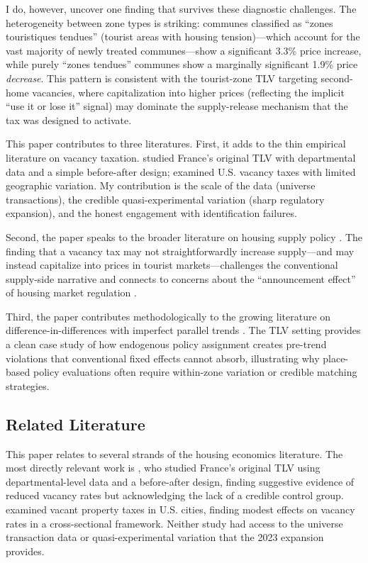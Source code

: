 \documentclass[12pt]{article}
\begin{document}
I do, however, uncover one finding that survives these diagnostic challenges. The heterogeneity between zone types is striking: communes classified as ``zones touristiques tendues'' (tourist areas with housing tension)---which account for the vast majority of newly treated communes---show a significant 3.3\% price increase, while purely ``zones tendues'' communes show a marginally significant 1.9\% price \textit{decrease}. This pattern is consistent with the tourist-zone TLV targeting second-home vacancies, where capitalization into higher prices (reflecting the implicit ``use it or lose it'' signal) may dominate the supply-release mechanism that the tax was designed to activate.

This paper contributes to three literatures. First, it adds to the thin empirical literature on vacancy taxation. \citet{bono2012evaluating} studied France's original TLV with departmental data and a simple before-after design; \citet{deboer2004vacant} examined U.S. vacancy taxes with limited geographic variation. My contribution is the scale of the data (universe transactions), the credible quasi-experimental variation (sharp regulatory expansion), and the honest engagement with identification failures.

Second, the paper speaks to the broader literature on housing supply policy \citep{saiz2010geographic, hilber2016impact, gyourko2008new}. The finding that a vacancy tax may not straightforwardly increase supply---and may instead capitalize into prices in tourist markets---challenges the conventional supply-side narrative and connects to concerns about the ``announcement effect'' of housing market regulation \citep{autor2014housing, diamond2019effects}.

Third, the paper contributes methodologically to the growing literature on difference-in-differences with imperfect parallel trends \citep{roth2023pretest, rambachan2023more, goodmanbacon2021difference}. The TLV setting provides a clean case study of how endogenous policy assignment creates pre-trend violations that conventional fixed effects cannot absorb, illustrating why place-based policy evaluations often require within-zone variation or credible matching strategies.

\subsection*{Related Literature}

This paper relates to several strands of the housing economics literature. The most directly relevant work is \citet{bono2012evaluating}, who studied France's original TLV using departmental-level data and a before-after design, finding suggestive evidence of reduced vacancy rates but acknowledging the lack of a credible control group. \citet{deboer2004vacant} examined vacant property taxes in U.S. cities, finding modest effects on vacancy rates in a cross-sectional framework. Neither study had access to the universe transaction data or quasi-experimental variation that the 2023 expansion provides.
\end{document}
